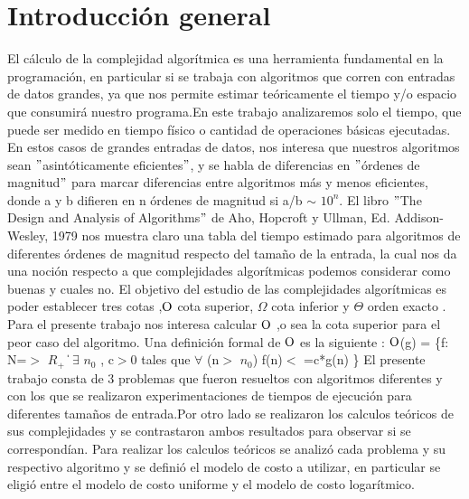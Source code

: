 \section{Introducción general}
El cálculo de la complejidad algorítmica es una herramienta fundamental en la programación, en particular si se trabaja con algoritmos que corren con entradas de datos grandes, ya que nos permite estimar teóricamente el tiempo y/o espacio que consumirá nuestro programa.En este trabajo analizaremos solo el tiempo, que puede ser medido en tiempo físico o cantidad de operaciones básicas ejecutadas.
\newline
En estos casos de grandes entradas de datos, nos interesa que nuestros algoritmos sean $"$asintóticamente eficientes$"$, y se habla de diferencias en $"$órdenes de magnitud$"$ para marcar diferencias entre algoritmos más y menos eficientes, donde a y b difieren en n órdenes de magnitud si a/b $\sim$ $10^{n}$.
\newline
El libro $"$The Design and Analysis of Algorithms$"$ de Aho, Hopcroft y Ullman, Ed. Addison-Wesley, 1979 nos muestra claro una tabla del tiempo estimado para algoritmos de diferentes órdenes de magnitud respecto del tamaño de la entrada, la cual nos da una noción respecto a que complejidades algorítmicas podemos considerar como buenas y cuales no. 
\newline
El objetivo del estudio de las complejidades algorítmicas es poder establecer tres cotas ,$\rm O$ cota superior, $\Omega$ cota inferior y  $\Theta$ orden exacto .
\newline
Para el presente trabajo nos interesa calcular $\rm O$ ,o sea la cota superior para el peor caso del algoritmo.
\newline
Una definición formal de $\rm O$ es la siguiente :
\newline
$\rm O$(g) = \{f: N=$>$ $R_+$ \| $\exists$ $n_0$ , c$>$0 tales que $\forall$ (n$>$ $n_0$) f(n)$<$ =c*g(n) \}
\newline
El presente trabajo consta de 3 problemas que fueron resueltos con algoritmos diferentes y con los que se realizaron experimentaciones de tiempos de ejecución para diferentes tamaños de entrada.Por otro lado se realizaron los calculos teóricos de sus complejidades y se contrastaron ambos resultados para observar si se correspondían.
\newline
Para realizar los calculos teóricos se analizó cada problema y su respectivo algoritmo y se definió el modelo de costo a utilizar, en particular se eligió entre el modelo de costo uniforme y el modelo de costo logarítmico.